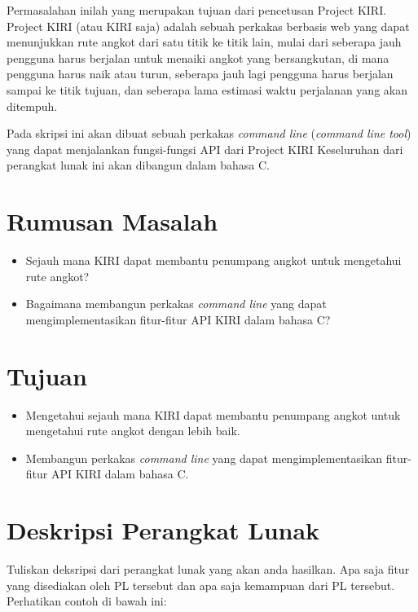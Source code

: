 \documentclass[a4paper,twoside]{article}
\begin{document}
Permasalahan inilah yang merupakan tujuan dari pencetusan Project KIRI. Project KIRI (atau KIRI saja) adalah sebuah perkakas berbasis web yang dapat menunjukkan rute angkot dari satu titik ke titik lain, mulai dari seberapa jauh pengguna harus berjalan untuk menaiki angkot yang bersangkutan, di mana pengguna harus naik atau turun, seberapa jauh lagi pengguna harus berjalan sampai ke titik tujuan, dan seberapa lama estimasi waktu perjalanan yang akan ditempuh.

Pada skripsi ini akan dibuat sebuah perkakas \textit{command line} (\textit{command line tool}) yang dapat menjalankan fungsi-fungsi API dari Project KIRI Keseluruhan dari perangkat lunak ini akan dibangun dalam bahasa C.

\section{Rumusan Masalah}
\begin{itemize}
	\item Sejauh mana KIRI dapat membantu penumpang angkot untuk mengetahui rute angkot?
	\item Bagaimana membangun perkakas \textit{command line} yang dapat mengimplementasikan fitur-fitur API KIRI dalam bahasa C?
\end{itemize}

\section{Tujuan}
\begin{itemize}
	\item Mengetahui sejauh mana KIRI dapat membantu penumpang angkot untuk mengetahui rute angkot dengan lebih baik.
	\item Membangun perkakas \textit{command line} yang dapat mengimplementasikan fitur-fitur API KIRI dalam bahasa C.
\end{itemize}

\section{Deskripsi Perangkat Lunak}
Tuliskan deksripsi dari perangkat lunak yang akan anda hasilkan. Apa saja fitur yang disediakan oleh PL tersebut dan apa saja kemampuan dari PL tersebut. Perhatikan contoh di bawah ini:
\end{document}
